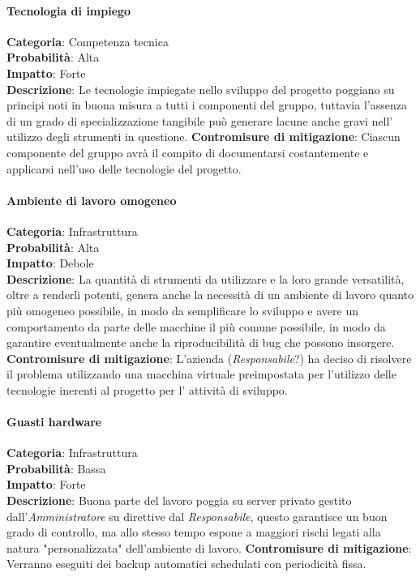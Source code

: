 \documentclass{scalatekids-article}
\begin{document}
\paragraph{Tecnologia di impiego}
\textbf{Categoria}: Competenza tecnica\\
\textbf{Probabilità}: Alta\\
\textbf{Impatto}: Forte\\
\textbf{Descrizione}: Le tecnologie impiegate nello sviluppo del progetto poggiano su principi noti in buona misura a tutti
i componenti del gruppo, tuttavia l'assenza di un grado di specializzazione tangibile può generare lacune anche gravi nell' utilizzo
degli strumenti in questione.
\textbf{Contromisure di mitigazione}: Ciascun componente del gruppo avrà il compito di documentarsi costantemente e applicarsi
nell'uso delle tecnologie del progetto.
\paragraph{Ambiente di lavoro omogeneo}
\textbf{Categoria}: Infrastruttura\\
\textbf{Probabilità}: Alta\\
\textbf{Impatto}: Debole\\
\textbf{Descrizione}: La quantità di strumenti da utilizzare e la loro grande versatilità, oltre a renderli potenti, genera anche
la necessità di un ambiente di lavoro quanto più omogeneo possibile, in modo da semplificare lo sviluppo e avere un comportamento
da parte delle macchine il più comune possibile, in modo da garantire eventualmente anche la riproducibilità di bug che possono
insorgere.
\textbf{Contromisure di mitigazione}: L'azienda (\textit{Responsabile}?) ha deciso di risolvere il problema utilizzando una macchina virtuale
preimpostata per l'utilizzo delle tecnologie inerenti al progetto per l' attività di sviluppo.
\paragraph{Guasti hardware}
\textbf{Categoria}: Infrastruttura\\
\textbf{Probabilità}: Bassa\\
\textbf{Impatto}: Forte\\
\textbf{Descrizione}: Buona parte del lavoro poggia su server privato gestito dall'\textit{Amministratore} su direttive dal \textit{Responsabile},
questo garantisce un buon grado di controllo, ma allo stesso tempo espone a maggiori rischi legati alla natura "personalizzata" dell'ambiente di lavoro.
\textbf{Contromisure di mitigazione}: Verranno eseguiti dei backup automatici schedulati con periodicità fissa.
\end{document}
